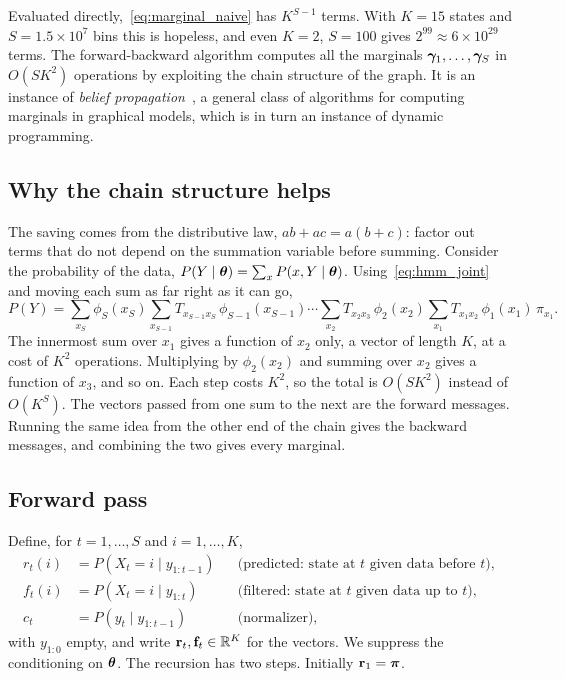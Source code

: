 Evaluated directly,~\eqref{eq:marginal_naive} has $K^{S-1}$ terms. With $K=15$ states and $S=1.5\times 10^7$ bins this is hopeless, and even $K=2$, $S=100$ gives $2^{99}\approx 6\times 10^{29}$ terms. The forward-backward algorithm computes all the marginals $\boldsymbol{\gamma}_1,\dots,\boldsymbol{\gamma}_S$ in $O(SK^2)$ operations by exploiting the chain structure of the graph. It is an instance of \emph{belief propagation}~\citep{pearl1988}, a general class of algorithms for computing marginals in graphical models, which is in turn an instance of dynamic programming.

\subsection{Why the chain structure helps}

The saving comes from the distributive law, $ab+ac=a(b+c)$: factor out terms that do not depend on the summation variable before summing. Consider the probability of the data, $P(Y\mid\boldsymbol{\theta})=\sum_x P(x,Y\mid\boldsymbol{\theta})$. Using~\eqref{eq:hmm_joint} and moving each sum as far right as it can go,
\begin{equation}
  P(Y) = \sum_{x_S}\phi_S(x_S)\sum_{x_{S-1}}T_{x_{S-1}x_S}\,\phi_{S-1}(x_{S-1})\cdots\sum_{x_2}T_{x_2x_3}\,\phi_2(x_2)\sum_{x_1}T_{x_1x_2}\,\phi_1(x_1)\,\pi_{x_1}.
\end{equation}
The innermost sum over $x_1$ gives a function of $x_2$ only, a vector of length $K$, at a cost of $K^2$ operations. Multiplying by $\phi_2(x_2)$ and summing over $x_2$ gives a function of $x_3$, and so on. Each step costs $K^2$, so the total is $O(SK^2)$ instead of $O(K^S)$. The vectors passed from one sum to the next are the forward messages. Running the same idea from the other end of the chain gives the backward messages, and combining the two gives every marginal.

\subsection{Forward pass}

Define, for $t=1,\dots,S$ and $i=1,\dots,K$,
\begin{align}
  r_t(i) &= P(X_t=i\mid y_{1:t-1}) && \text{(predicted: state at $t$ given data before $t$)},\\
  f_t(i) &= P(X_t=i\mid y_{1:t}) && \text{(filtered: state at $t$ given data up to $t$)},\\
  c_t &= P(y_t\mid y_{1:t-1}) && \text{(normalizer)},
\end{align}
with $y_{1:0}$ empty, and write $\mathbf{r}_t,\mathbf{f}_t\in\mathbb{R}^K$ for the vectors. We suppress the conditioning on $\boldsymbol{\theta}$. The recursion has two steps. Initially $\mathbf{r}_1=\boldsymbol{\pi}$.

